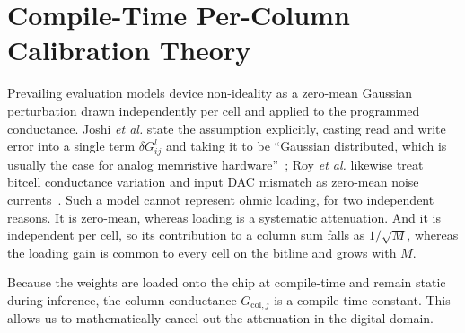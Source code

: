\documentclass[conference]{IEEEtran}
\begin{document}
\section{Compile-Time Per-Column Calibration Theory}
\label{sec:calibration}
Prevailing evaluation models device non-ideality as a zero-mean Gaussian perturbation drawn independently per cell and applied to the programmed conductance. Joshi \emph{et al.} state the assumption explicitly, casting read and write error into a single term $\delta G^{l}_{ij}$ and taking it to be ``Gaussian distributed, which is usually the case for analog memristive hardware''~\cite{joshi2020}; Roy \emph{et al.} likewise treat bitcell conductance variation and input DAC mismatch as zero-mean noise currents~\cite{shanbhag}. Such a model cannot represent ohmic loading, for two independent reasons. It is zero-mean, whereas loading is a systematic attenuation. And it is independent per cell, so its contribution to a column sum falls as $1/\sqrt{M}$, whereas the loading gain is common to every cell on the bitline and grows with $M$.

Because the weights are loaded onto the chip at compile-time and remain static during inference, the column conductance $G_{\text{col}, j}$ is a compile-time constant. This allows us to mathematically cancel out the attenuation in the digital domain.
\end{document}
